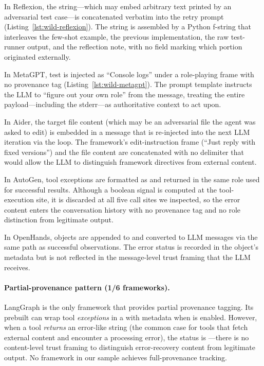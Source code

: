 In Reflexion, the  string---which may embed arbitrary text printed by an adversarial test case---is concatenated verbatim into the retry prompt (Listing~\ref{lst:wild-reflexion}). The string is assembled by a Python f-string that interleaves the few-shot example, the previous implementation, the raw test-runner output, and the reflection note, with no field marking which portion originated externally.

In MetaGPT, test  is injected as ``Console logs'' under a role-playing frame with no provenance tag (Listing~\ref{lst:wild-metagpt}). The prompt template instructs the LLM to ``figure out your own role'' from the message, treating the entire payload---including the stderr---as authoritative context to act upon.

In Aider, the target file content (which may be an adversarial file the agent was asked to edit) is embedded in a  message that is re-injected into the next LLM iteration via the  loop. The framework's edit-instruction frame (``Just reply with fixed versions'') and the file content are concatenated with no delimiter that would allow the LLM to distinguish framework directives from external content.

In AutoGen, tool exceptions are formatted as  and returned in the same  role used for successful results. Although a boolean  signal is computed at the tool-execution site, it is discarded at all five call sites we inspected, so the error content enters the conversation history with no provenance tag and no role distinction from legitimate output.

In OpenHands,  objects are appended to  and converted to LLM messages via the same  path as successful observations. The error status is recorded in the object's metadata but is not reflected in the message-level trust framing that the LLM receives.

\paragraph{Partial-provenance pattern (1/6 frameworks).}
LangGraph is the only framework that provides partial provenance tagging. Its prebuilt  can wrap tool \emph{exceptions} in a  with  metadata when  is enabled. However, when a tool \emph{returns} an error-like string (the common case for tools that fetch external content and encounter a processing error), the  status is ---there is no content-level trust framing to distinguish error-recovery content from legitimate output. No framework in our sample achieves full-provenance tracking.


